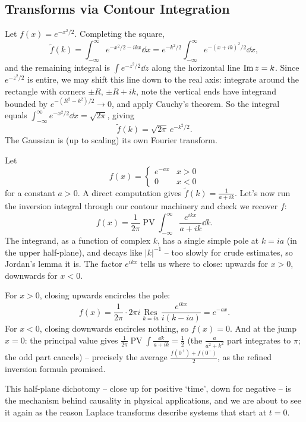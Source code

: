 \documentclass[a4paper]{scrartcl}
\newcommand{\Res}{\operatorname*{Res}}
\newcommand{\pv}{\operatorname{PV}}
\begin{document}
\subsection{Transforms via Contour Integration}

\begin{example}
	Let $f(x) = e^{-x^2/2}$. Completing the square,
	$$
	\tilde f(k) = \int_{-\infty}^\infty e^{-x^2/2 - ikx} \dd x = e^{-k^2/2} \int_{-\infty}^\infty e^{-(x + ik)^2/2} \dd x,
	$$
	and the remaining integral is $\int e^{-z^2/2} \dd z$ along the horizontal line $\operatorname{Im} z = k$. Since $e^{-z^2/2}$ is entire, we may shift this line down to the real axis: integrate around the rectangle with corners $\pm R$, $\pm R + ik$, note the vertical ends have integrand bounded by $e^{-(R^2 - k^2)/2} \to 0$, and apply Cauchy's theorem. So the integral equals $\int_{-\infty}^\infty e^{-x^2/2} \dd x = \sqrt{2\pi}$, giving
	$$
	\tilde f(k) = \sqrt{2\pi}\, e^{-k^2/2}.
	$$
	The Gaussian is (up to scaling) its own Fourier transform.
\end{example}

\begin{example}
	Let
	$$
	f(x) = \begin{cases} e^{-ax} & x > 0 \\ 0 & x < 0\end{cases}
	$$
	for a constant $a > 0$. A direct computation gives $\tilde f(k) = \frac{1}{a + ik}$. Let's now run the inversion integral through our contour machinery and check we recover $f$:
	$$
	f(x) = \frac{1}{2\pi} \pv\int_{-\infty}^\infty \frac{e^{ikx}}{a + ik} \dd k.
	$$
	The integrand, as a function of complex $k$, has a single simple pole at $k = ia$ (in the upper half-plane), and decays like $|k|^{-1}$ -- too slowly for crude estimates, so Jordan's lemma it is. The factor $e^{ikx}$ tells us where to close: upwards for $x > 0$, downwards for $x < 0$.

	For $x > 0$, closing upwards encircles the pole:
	$$
	f(x) = \frac{1}{2\pi} \cdot 2\pi i \Res_{k = ia} \frac{e^{ikx}}{i(k - ia)} = e^{-ax}.
	$$
	For $x < 0$, closing downwards encircles nothing, so $f(x) = 0$. And at the jump $x = 0$: the principal value gives $\frac{1}{2\pi}\pv \int \frac{\dd k}{a + ik} = \frac 12$ (the $\frac{a}{a^2 + k^2}$ part integrates to $\pi$; the odd part cancels) -- precisely the average $\frac{f(0^+) + f(0^-)}{2}$, as the refined inversion formula promised.
\end{example}

This half-plane dichotomy -- close up for positive `time', down for negative -- is the mechanism behind causality in physical applications, and we are about to see it again as the reason Laplace transforms describe systems that start at $t = 0$.
\end{document}
